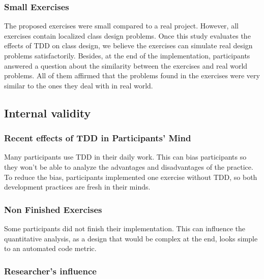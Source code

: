 \documentclass[times]{speauth}
\begin{document}
\subsubsection{Small Exercises}

The proposed exercises were small compared to a real project. However, all exercises
contain localized class design problems. Once this study evaluates the effects
of TDD on class design, we believe the exercises can simulate real design problems
satisfactorily.
Besides, at the end of the implementation, participants answered a question about the
similarity between the exercises and real world problems. All of them affirmed that
the problems found in the exercises were very similar to the ones they deal with in real world.

\subsection{Internal validity}

\subsubsection{Recent effects of TDD in Participants' Mind}

Many participants use TDD in their daily work. This can bias participants so they
won't be able to analyze the advantages and disadvantages of the practice.
To reduce the bias, participants implemented one exercise without TDD, so both
development practices are fresh in their minds.

\subsubsection{Non Finished Exercises}

Some participants did not finish their implementation. This can influence the
quantitative analysis, as a design that would be complex at the end, looks simple
to an automated code metric.

\subsubsection{Researcher's influence}
\end{document}
